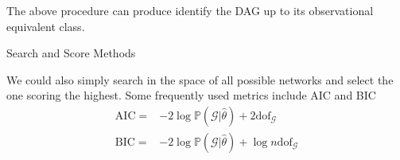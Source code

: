 The above procedure can produce identify the DAG up to its observational equivalent class.




\begin{point}
    Search and Score Methods
\end{point}

We could also simply search in the space of all possible networks and select the one scoring the highest. Some frequently used metrics include AIC and BIC
\begin{align*}
    \mathrm{AIC}=&-2\log \mathbb{P}\left( \mathcal{G}|\hat{\theta }  \right) + 2\mathrm{dof}_\mathcal{G} \\
    \mathrm{BIC}=&-2\log \mathbb{P}\left( \mathcal{G}|\hat{\theta } \right) +\log n \mathrm{dof}_\mathcal{G}   
\end{align*}

\subsubsection{}
    
















            
    
    
